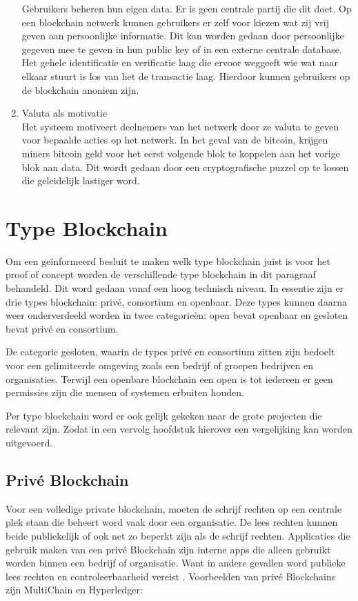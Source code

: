 \begin{enumerate}
	Gebruikers beheren hun eigen data. Er is geen centrale partij die dit doet. Op een blockchain netwerk kunnen gebruikers er zelf voor kiezen wat zij vrij geven aan persoonlijke informatie. Dit kan worden gedaan door persoonlijke gegeven mee te geven in hun public key of in een externe centrale database. Het gehele identificatie en verificatie laag die ervoor weggeeft wie wat naar elkaar stuurt is los van het de transactie laag. Hierdoor kunnen gebruikers op de blockchain anoniem zijn.	
	\item Valuta als motivatie\\
	Het systeem motiveert deelnemers van het netwerk door ze valuta te geven voor bepaalde acties op het netwerk. In het geval van de bitcoin, krijgen miners bitcoin geld voor het eerst volgende blok te koppelen aan het vorige blok aan data. Dit wordt gedaan door een cryptografische puzzel op te lossen die geleidelijk lastiger word.
\end{enumerate}
\newpage

\section{Type Blockchain}
Om een geïnformeerd besluit te maken welk type blockchain juist is voor het proof of concept worden de verschillende type blockchain in dit paragraaf behandeld. Dit word gedaan vanaf een hoog technisch niveau. In essentie zijn er drie types blockchain: privé, consortium en openbaar. Deze types kunnen daarna weer onderverdeeld worden in twee categorieën: open bevat openbaar en gesloten bevat privé en consortium. \par

De categorie gesloten, waarin de types privé en consortium zitten zijn bedoelt voor een gelimiteerde omgeving zoals een bedrijf of groepen bedrijven en organisaties. Terwijl een openbare blockchain een open is tot iedereen er geen permissies zijn die mensen of systemen erbuiten houden.\par

Per type blockchain word er ook gelijk gekeken naar de grote projecten die relevant zijn. Zodat in een vervolg hoofdstuk hierover een vergelijking kan worden uitgevoerd.

\subsection{Privé Blockchain}
Voor een volledige private blockchain, moeten de schrijf rechten op een centrale plek staan die beheert word vaak door een organisatie. De lees rechten kunnen beide publiekelijk of ook net zo beperkt zijn als de schrijf rechten. Applicaties die gebruik maken van een privé Blockchain zijn interne apps die alleen gebruikt worden binnen een bedrijf of organisatie. Want in andere gevallen word publieke lees rechten en controleerbaarheid vereist \cite{privateBlockChains}. Voorbeelden van privé Blockchains zijn MultiChain en Hyperledger:

